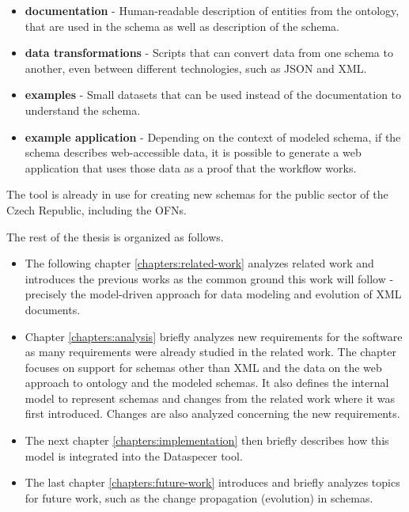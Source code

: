 \begin{itemize}
    \item \textbf{documentation} - Human-readable description of entities from the ontology, that are used in the schema as well as description of the schema.
    \item \textbf{data transformations} - Scripts that can convert data from one schema to another, even between different technologies, such as JSON and XML.
    \item \textbf{examples} - Small datasets that can be used instead of the documentation to understand the schema.
    \item \textbf{example application} - Depending on the context of modeled schema, if the schema describes web-accessible data, it is possible to generate a web application that uses those data as a proof that the workflow works.
\end{itemize}

The tool is already in use for creating new schemas for the public sector of the Czech Republic, including the OFNs.

\bigskip

\noindent The rest of the thesis is organized as follows.

\begin{itemize}
    \item The following chapter \ref{chapters:related-work} analyzes related work and introduces the previous works as the common ground this work will follow - precisely the model-driven approach for data modeling and evolution of XML documents.
    \item Chapter \ref{chapters:analysis} briefly analyzes new requirements for the software as many requirements were already studied in the related work. The chapter focuses on support for schemas other than XML and the data on the web \cite{data-on-the-web} approach to ontology and the modeled schemas.
    It also defines the internal model to represent schemas and changes from the related work where it was first introduced. Changes are also analyzed concerning the new requirements.
    \item The next chapter \ref{chapters:implementation} then briefly describes how this model is integrated into the Dataspecer tool.
    \item The last chapter \ref{chapters:future-work} introduces and briefly analyzes topics for future work, such as the change propagation (evolution) in schemas.
\end{itemize}


